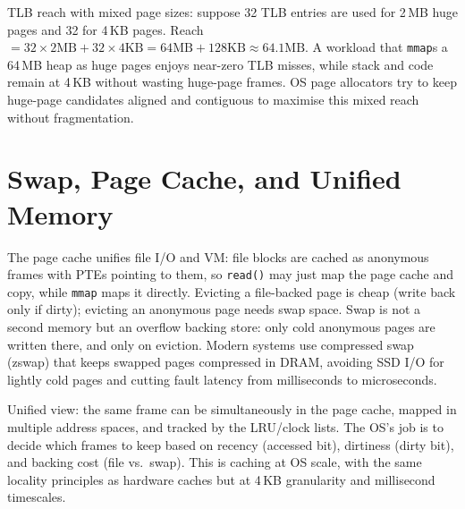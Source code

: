 TLB reach with mixed page sizes: suppose 32 TLB entries are used for 2\,MB huge pages and 32 for 4\,KB pages. Reach $=32\times2\text{MB}+32\times4\text{KB}=64\text{MB}+128\text{KB}\approx64.1\text{MB}$. A workload that \texttt{mmap}s a 64\,MB heap as huge pages enjoys near-zero TLB misses, while stack and code remain at 4\,KB without wasting huge-page frames. OS page allocators try to keep huge-page candidates aligned and contiguous to maximise this mixed reach without fragmentation.

\begin{center}
\end{center}

\section{Swap, Page Cache, and Unified Memory}
The page cache unifies file I/O and VM: file blocks are cached as anonymous frames with PTEs pointing to them, so \texttt{read()} may just map the page cache and copy, while \texttt{mmap} maps it directly. Evicting a file-backed page is cheap (write back only if dirty); evicting an anonymous page needs swap space. Swap is not a second memory but an overflow backing store: only cold anonymous pages are written there, and only on eviction. Modern systems use compressed swap (zswap) that keeps swapped pages compressed in DRAM, avoiding SSD I/O for lightly cold pages and cutting fault latency from milliseconds to microseconds.

Unified view: the same frame can be simultaneously in the page cache, mapped in multiple address spaces, and tracked by the LRU/clock lists. The OS's job is to decide which frames to keep based on recency (accessed bit), dirtiness (dirty bit), and backing cost (file vs.\ swap). This is caching at OS scale, with the same locality principles as hardware caches but at 4\,KB granularity and millisecond timescales.

